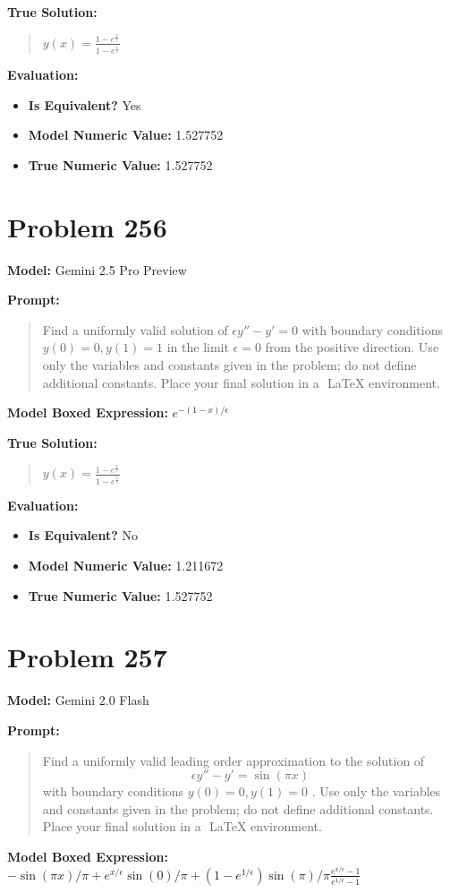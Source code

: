 \documentclass{article}
\begin{document}
{\textbf{True Solution:}
\begin{quote}
$y(x) = \frac{1-e^{\frac{x}{\epsilon}}}{1-e^{\frac{1}{\epsilon}}}$
\end{quote}

\textbf{Evaluation:}
\begin{itemize}
\item \textbf{Is Equivalent?} Yes
\item \textbf{Model Numeric Value:} 1.527752
\item \textbf{True Numeric Value:} 1.527752
\end{itemize}
\vspace{1cm}
\section*{Problem 256}
\textbf{Model:} Gemini 2.5 Pro Preview

\textbf{Prompt:}
\begin{quote}
Find a uniformly valid solution of $ \epsilon y'' - y' = 0$ with boundary conditions $ y(0) = 0, y(1) = 1$ in the limit $\epsilon = 0$ from the positive direction. Use only the variables and constants given in the problem; do not define additional constants. Place your final solution in a $\boxed{}$ LaTeX environment.
\end{quote}
\textbf{Model Boxed Expression:} $e^{-(1-x)/\epsilon}$

\textbf{True Solution:}
\begin{quote}
$y(x) = \frac{1-e^{\frac{x}{\epsilon}}}{1-e^{\frac{1}{\epsilon}}}$
\end{quote}

\textbf{Evaluation:}
\begin{itemize}
\item \textbf{Is Equivalent?} No
\item \textbf{Model Numeric Value:} 1.211672
\item \textbf{True Numeric Value:} 1.527752
\end{itemize}
\vspace{1cm}
\section*{Problem 257}
\textbf{Model:} Gemini 2.0 Flash

\textbf{Prompt:}
\begin{quote}
Find a uniformly valid leading order approximation to the solution of $$\epsilon y'' - y' = \sin(\pi x)$$ with boundary conditions $ y(0) = 0, y(1) = 0$ . Use only the variables and constants given in the problem; do not define additional constants. Place your final solution in a $\boxed{}$ LaTeX environment.
\end{quote}
\textbf{Model Boxed Expression:} $-\sin(\pi x) / \pi + e^{x/\epsilon} \sin(0) / \pi + (1-e^{1/\epsilon})\sin(\pi)/\pi \frac{e^{x/\epsilon}-1}{e^{1/\epsilon}-1}$

}
\end{document}
